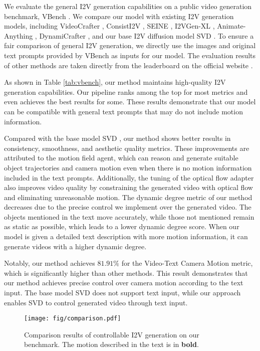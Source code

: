 We evaluate the general I2V generation capabilities on a public video generation benchmark, VBench \cite{huang2024vbench}. We compare our model with existing I2V generation models, including VideoCrafter \cite{chen2023videocrafter1}, ConsistI2V \cite{ren2024consisti2v}, SEINE \cite{chen2023seine}, I2VGen-XL \cite{zhang2023i2vgen}, Animate-Anything \cite{dai2023animateanything}, DynamiCrafter \cite{xing2025dynamicrafter}, and our base I2V diffusion model SVD \cite{blattmann2023stable}. To ensure a fair comparison of general I2V generation, we directly use the images and original text prompts provided by VBench as inputs for our model. The evaluation results of other methods are taken directly from the leaderboard on the official website \cite{Vbench}.

As shown in Table \ref{tab:vbench}, our method maintains high-quality I2V generation capabilities. Our pipeline ranks among the top for most metrics and even achieves the best results for some. These results demonstrate that our model can be compatible with general text prompts that may do not include motion information.

Compared with the base model SVD \cite{blattmann2023stable}, our method shows better results in consistency, smoothness, and aesthetic quality metrics. These improvements are attributed to the motion field agent, which can reason and generate suitable object trajectories and camera motion even when there is no motion information included in the text prompts. Additionally, the tuning of the optical flow adapter also improves video quality by constraining the generated video with optical flow and eliminating unreasonable motion. The dynamic degree metric of our method decreases due to the precise control we implement over the generated video. The objects mentioned in the text move accurately, while those not mentioned remain as static as possible, which leads to a lower dynamic degree score. When our model is given a detailed text description with more motion information, it can generate videos with a higher dynamic degree.

Notably, our method achieves $81.91\%$ for the Video-Text Camera Motion metric, which is significantly higher than other methods. This result demonstrates that our method achieves precise control over camera motion according to the text input. The base model SVD does not support text input, while our approach enables SVD to control generated video through text input.

\begin{figure*}[t]
\centering
\texttt{[image: fig/comparison.pdf]}
\caption{Comparison results of controllable I2V generation on our benchmark. The motion described in the text is in \textbf{bold}.}
\label{fig:comparison}
\end{figure*}

